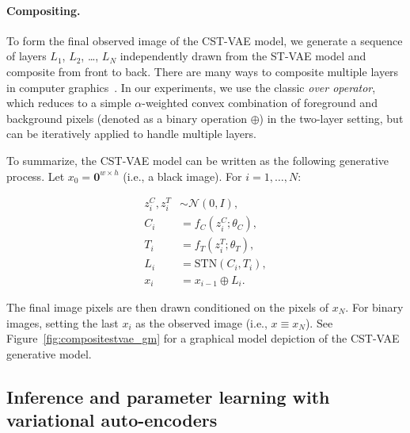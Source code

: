 \paragraph{Compositing.}
To form the final observed image of the CST-VAE model, we generate a sequence of layers $L_1$, $L_2$, \dots, $L_N$
independently drawn from the ST-VAE model and composite from front to back.
There are many  ways to composite multiple layers in computer graphics~\citep{porter1984compositing}.
In our experiments, we use  the classic \emph{over operator}, which reduces to a simple $\alpha$-weighted
convex combination of foreground and background pixels (denoted as a  binary  operation $\oplus$)
in the two-layer setting, but can be iteratively applied
to handle multiple layers. %

 

To summarize, the CST-VAE model can be written as the following generative process.  Let $x_0=\mathbf{0}^{w\times h}$ (i.e., a black image).   For $i=1,\dots,N$:\vspace{-4mm}

{\footnotesize
\begin{align*}
z_i^C, z_i^T  &\sim \mathcal{N}(0, I), \\
C_i &= f_C(z_i^C; \theta_C), \\
T_i &= f_T(z_i^T; \theta_T), \\
L_i &= \mbox{STN}(C_i, T_i), \\
x_i &= x_{i-1} \oplus L_i.
\end{align*}\vspace{-4mm}
}

The final image pixels are then drawn conditioned on the pixels of $x_N$.  For binary images,
setting the last $x_i$ as the observed image (i.e., $x\equiv x_N$). 
See Figure~\ref{fig:compositestvae_gm} for
 a graphical model depiction of the CST-VAE generative model.




\subsection{Inference and parameter learning with variational auto-encoders}


